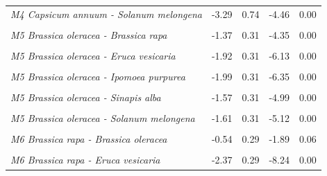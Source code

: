 \documentclass[12pt,]{article}
\begin{document}
\begin{longtable}[t]{>{}lrrrr}
\addlinespace
\em{M4 Capsicum annuum - Solanum melongena} & -3.29 & 0.74 & -4.46 & 0.00\\
\addlinespace
\em{\cellcolor{gray!6}{M5 Brassica oleracea - (Intercept)}} & \cellcolor{gray!6}{1.99} & \cellcolor{gray!6}{0.22} & \cellcolor{gray!6}{8.98} & \cellcolor{gray!6}{0.00}\\
\addlinespace
\em{M5 Brassica oleracea - Brassica rapa} & -1.37 & 0.31 & -4.35 & 0.00\\
\addlinespace
\em{\cellcolor{gray!6}{M5 Brassica oleracea - Capsicum annuum}} & \cellcolor{gray!6}{-0.87} & \cellcolor{gray!6}{0.31} & \cellcolor{gray!6}{-2.76} & \cellcolor{gray!6}{0.01}\\
\addlinespace
\em{M5 Brassica oleracea - Eruca vesicaria} & -1.92 & 0.31 & -6.13 & 0.00\\
\addlinespace
\em{\cellcolor{gray!6}{M5 Brassica oleracea - Ipomoea aquatica}} & \cellcolor{gray!6}{-1.91} & \cellcolor{gray!6}{0.27} & \cellcolor{gray!6}{-7.04} & \cellcolor{gray!6}{0.00}\\
\addlinespace
\em{M5 Brassica oleracea - Ipomoea purpurea} & -1.99 & 0.31 & -6.35 & 0.00\\
\addlinespace
\em{\cellcolor{gray!6}{M5 Brassica oleracea - Petunia integrifolia}} & \cellcolor{gray!6}{-1.64} & \cellcolor{gray!6}{0.31} & \cellcolor{gray!6}{-5.21} & \cellcolor{gray!6}{0.00}\\
\addlinespace
\em{M5 Brassica oleracea - Sinapis alba} & -1.57 & 0.31 & -4.99 & 0.00\\
\addlinespace
\em{\cellcolor{gray!6}{M5 Brassica oleracea - Solanum lycopersicum}} & \cellcolor{gray!6}{-1.47} & \cellcolor{gray!6}{0.31} & \cellcolor{gray!6}{-4.70} & \cellcolor{gray!6}{0.00}\\
\addlinespace
\em{M5 Brassica oleracea - Solanum melongena} & -1.61 & 0.31 & -5.12 & 0.00\\
\addlinespace
\em{\cellcolor{gray!6}{M6 Brassica rapa - (Intercept)}} & \cellcolor{gray!6}{2.37} & \cellcolor{gray!6}{0.19} & \cellcolor{gray!6}{12.49} & \cellcolor{gray!6}{0.00}\\
\addlinespace
\em{M6 Brassica rapa - Brassica oleracea} & -0.54 & 0.29 & -1.89 & 0.06\\
\addlinespace
\em{\cellcolor{gray!6}{M6 Brassica rapa - Capsicum annuum}} & \cellcolor{gray!6}{-1.42} & \cellcolor{gray!6}{0.29} & \cellcolor{gray!6}{-4.94} & \cellcolor{gray!6}{0.00}\\
\addlinespace
\em{M6 Brassica rapa - Eruca vesicaria} & -2.37 & 0.29 & -8.24 & 0.00\\

\end{longtable}
\end{document}
